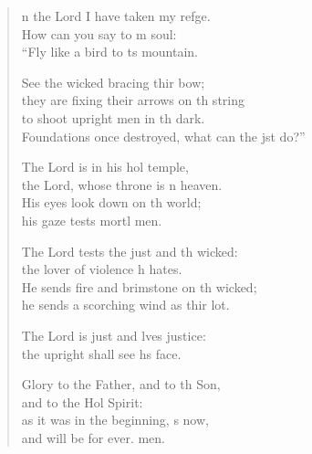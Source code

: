 \settowidth{\versewidth}{Foundations once destroyed, what can the just do?”}
\begin{verse}%
  \begin{patverse}
n the Lord I have taken my refge.\Flex\\
How can you say to m soul:\Med\\
“Fly like a bird to \pointup{\i}ts mountain.

See the wicked bracing thir bow;\Med\\
they are fixing their arrows on th string\\
to shoot upright men in th dark.\Med\\
Foundations once destroyed, what can the jst do?”

The Lord is in his hol temple,\Med\\
the Lord, whose throne is \pointup{\i}n heaven.\\
His eyes look down on th world;\Med\\
his gaze tests mortl men.

The Lord tests the just and th wicked:\Med\\
the lover of violence h hates.\\
He sends fire and brimstone on th wicked;\Med\\
he sends a scorching wind as thir lot.

The Lord is just and lves justice:\Med\\
the upright shall see h\pointup{\i}s face.

Glory to the Father, and to th Son,\Med\\
and to the Hol Spirit:\\
as it was in the beginning, \pointup{\i}s now,\Med\\
and will be for ever. men.
  \end{patverse}
\end{verse}
